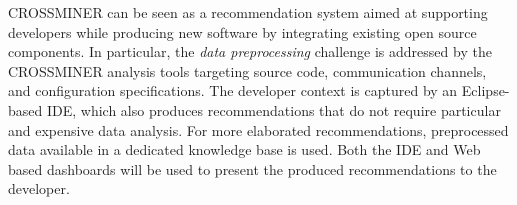 CROSSMINER can be seen as a recommendation system aimed at supporting 
developers while producing new software by integrating existing open source 
components. In particular, the \textit{data preprocessing} challenge is 
addressed by the CROSSMINER analysis tools targeting source code, communication 
channels, and configuration specifications. The developer context is captured 
by an Eclipse-based IDE, which also produces recommendations that do not 
require particular and expensive data analysis. For more elaborated 
recommendations, preprocessed data available in a dedicated knowledge base is 
used. Both the IDE and Web based dashboards will be used to present the 
produced recommendations to the developer. 

%
%
%
